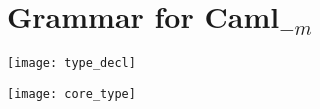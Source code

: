 
\section{Grammar for Caml$_{-m}$}
\label{sec:grammar}

\texttt{[image: type\_decl]}

\texttt{[image: core\_type]}
